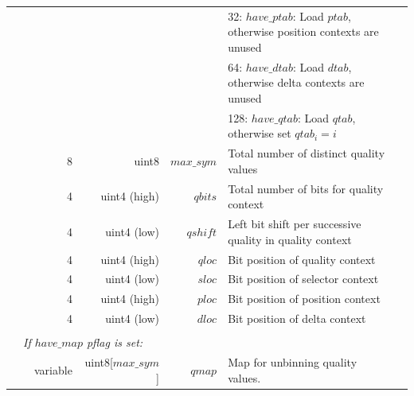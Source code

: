 \documentclass[a4paper]{article}
\begin{document}
\begin{table}
\begin{tabular}{|r|r|r|r|r|p{8cm}|l|l|}
                       & \multicolumn{2}{r|}{}         &                &                                & \multicolumn{2}{p{8.4cm}|}{32: $have\_ptab$: Load $ptab$, otherwise position contexts are unused} & \\
                       & \multicolumn{2}{r|}{}         &                &                                & \multicolumn{2}{p{8.4cm}|}{64: $have\_dtab$: Load $dtab$, otherwise delta contexts are unused} & \\
                       & \multicolumn{2}{r|}{}         &                &                                & \multicolumn{2}{p{8.4cm}|}{128: $have\_qtab$: Load $qtab$, otherwise set $qtab_i = i$} &\\
\cline{2-7}
                       & \multicolumn{2}{r|}{8}        & uint8          & $max\_sym$                     & \multicolumn{2}{p{8.4cm}|}{Total number of distinct quality values} & \\
\cline{2-7}
                       & \multicolumn{2}{r|}{4}        & uint4 (high)   & $qbits$                        & \multicolumn{2}{p{8.4cm}|}{Total number of bits for quality context} & \\
                       & \multicolumn{2}{r|}{4}        & uint4 (low)    & $qshift$                       & \multicolumn{2}{p{8.4cm}|}{Left bit shift per successive quality in quality context} & \\
                       & \multicolumn{2}{r|}{4}        & uint4 (high)   & $qloc$                         & \multicolumn{2}{p{8.4cm}|}{Bit position of quality context} & \\
                       & \multicolumn{2}{r|}{4}        & uint4 (low)    & $sloc$                         & \multicolumn{2}{p{8.4cm}|}{Bit position of selector context} & \\
                       & \multicolumn{2}{r|}{4}        & uint4 (high)   & $ploc$                         & \multicolumn{2}{p{8.4cm}|}{Bit position of position context} & \\
                       & \multicolumn{2}{r|}{4}        & uint4 (low)    & $dloc$                         & \multicolumn{2}{p{8.4cm}|}{Bit position of delta context }& \\
\cline{2-7}

& \multicolumn{6}{l|}{} & \\[-0.7em]
\multicolumn{1}{|l|}{} & \multicolumn{6}{l|}{ \textit{If $have\_map$ pflag is set:} } & \\
\cline{3-6}
                       &  & variable                   & uint8[$max\_sym$]          & $qmap$             & Map for unbinning quality values. & & \\
\cline{3-6}


\end{tabular}
\end{table}
\end{document}

